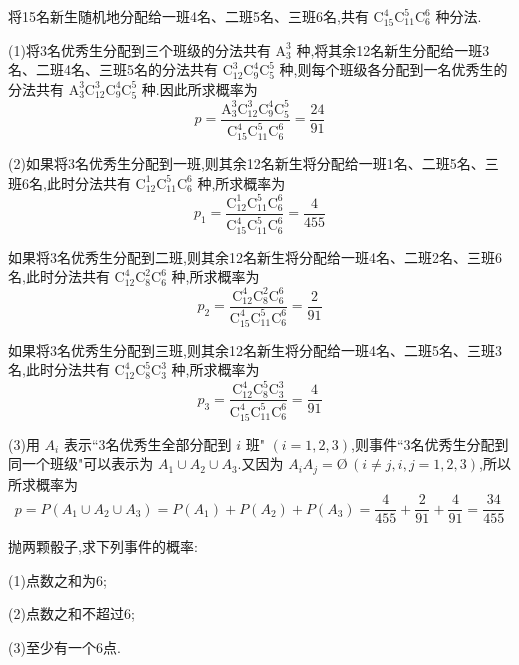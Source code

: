 \begin{solution}
    将15名新生随机地分配给一班4名、二班5名、三班6名,共有 $\mathrm{C}_{15}^4 \mathrm{C}_{11}^5 \mathrm{C}_6^6$ 种分法.

    (1)将3名优秀生分配到三个班级的分法共有 $\mathrm{A}_3^3$ 种,将其余12名新生分配给一班3名、二班4名、三班5名的分法共有 $\mathrm{C}_{12}^3 \mathrm{C}_9^4 \mathrm{C}_5^5$ 种,则每个班级各分配到一名优秀生的分法共有 $\mathrm{A}_3^3 \mathrm{C}_{12}^3 \mathrm{C}_9^4 \mathrm{C}_5^5$ 种.因此所求概率为
    $$
    p = \dfrac{\mathrm{A}_3^3 \mathrm{C}_{12}^3 \mathrm{C}_9^4 \mathrm{C}_5^5}{\mathrm{C}_{15}^4 \mathrm{C}_{11}^5 \mathrm{C}_6^6} = \dfrac{24}{91}
    $$

    (2)如果将3名优秀生分配到一班,则其余12名新生将分配给一班1名、二班5名、三班6名,此时分法共有 $\mathrm{C}_{12}^1 \mathrm{C}_{11}^5 \mathrm{C}_6^6$ 种,所求概率为
    $$
    p_1 = \dfrac{\mathrm{C}_{12}^1 \mathrm{C}_{11}^5 \mathrm{C}_6^6}{\mathrm{C}_{15}^4 \mathrm{C}_{11}^5 \mathrm{C}_6^6} = \dfrac{4}{455}
    $$

    如果将3名优秀生分配到二班,则其余12名新生将分配给一班4名、二班2名、三班6名,此时分法共有 $\mathrm{C}_{12}^4 \mathrm{C}_{8}^2 \mathrm{C}_6^6$ 种,所求概率为
    $$
    p_2 = \dfrac{\mathrm{C}_{12}^4 \mathrm{C}_{8}^2 \mathrm{C}_6^6}{\mathrm{C}_{15}^4 \mathrm{C}_{11}^5 \mathrm{C}_6^6} = \dfrac{2}{91}
    $$

    如果将3名优秀生分配到三班,则其余12名新生将分配给一班4名、二班5名、三班3名,此时分法共有 $\mathrm{C}_{12}^4 \mathrm{C}_{8}^5 \mathrm{C}_3^3$ 种,所求概率为
    $$
    p_3 = \dfrac{\mathrm{C}_{12}^4 \mathrm{C}_{8}^5 \mathrm{C}_3^3}{\mathrm{C}_{15}^4 \mathrm{C}_{11}^5 \mathrm{C}_6^6} = \dfrac{4}{91}
    $$

    (3)用 $A_i$ 表示``3名优秀生全部分配到 $i$ 班" $(i=1,2,3)$,则事件``3名优秀生分配到同一个班级"可以表示为 $A_1 \cup A_2 \cup A_3$.又因为 $A_i A_j = \text{\O} \, (i \not= j, i,j=1,2,3)$,所以所求概率为
    $$
    p = P(A_1 \cup A_2 \cup A_3) = P(A_1) + P(A_2) + P(A_3) = \dfrac{4}{455} + \dfrac{2}{91} + \dfrac{4}{91} = \dfrac{34}{455}
    $$
\end{solution}

\question 抛两颗骰子,求下列事件的概率:

(1)点数之和为6;

(2)点数之和不超过6;

(3)至少有一个6点.

